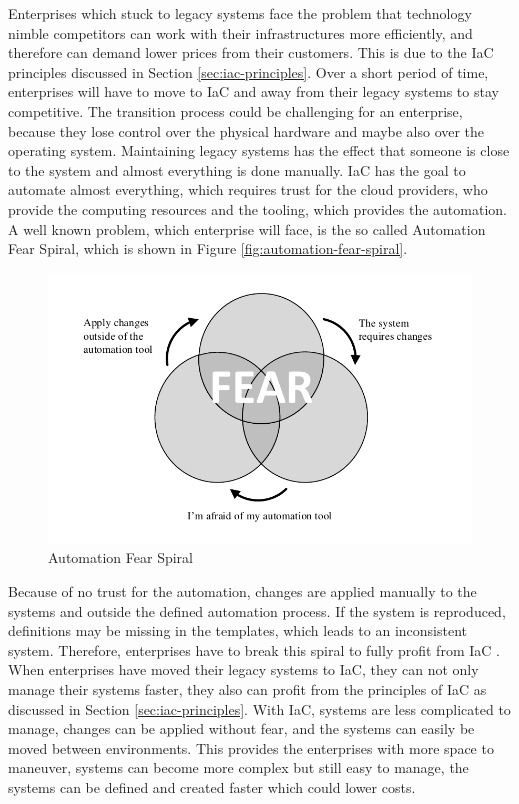 Enterprises which stuck to legacy systems face the problem that technology nimble competitors can work with their infrastructures more efficiently, and therefore can demand lower prices from their customers. This is due to the IaC principles discussed in Section \vref{sec:iac-principles}. Over a short period of time, enterprises will have to move to IaC and away from their legacy systems to stay competitive. The transition process could be challenging for an enterprise, because they lose control over the physical hardware and maybe also over the operating system. Maintaining legacy systems has the effect that someone is close to the system and almost everything is done manually. IaC has the goal to automate almost everything, which requires trust for the cloud providers, who provide the computing resources and the tooling, which provides the automation. A well known problem, which enterprise will face, is the so called Automation Fear Spiral, which is shown in Figure \vref{fig:automation-fear-spiral}.

\begin{figure}[htbp]
	\centering
	\includegraphics[scale=1]{images/automation-fear-spiral.pdf}
	\caption{Automation Fear Spiral}
	\label{fig:automation-fear-spiral}
\end{figure} 

Because of no trust for the automation, changes are applied manually to the systems and outside the defined automation process. If the system is reproduced, definitions may be missing in the templates, which leads to an inconsistent system. Therefore, enterprises have to break this spiral to fully profit from IaC \cite{Morris2016}. \\

When enterprises have moved their legacy systems to IaC, they can not only manage their systems faster, they also can profit from the principles of IaC as discussed in Section \vref{sec:iac-principles}. With IaC, systems are less complicated to manage, changes can be applied without fear, and the systems can easily be moved between environments. This provides the enterprises with more space to maneuver, systems can become more complex but still easy to manage, the systems can be defined and created faster which could lower costs.    


